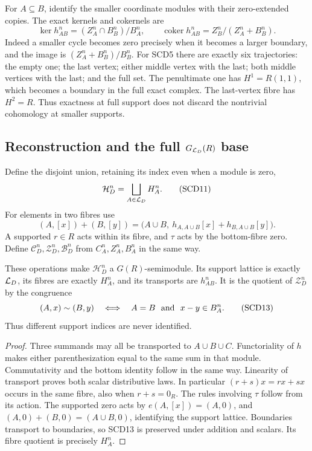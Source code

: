 For \(A\subseteq B\), identify the smaller coordinate modules with
their zero-extended copies. The exact kernels and cokernels are
\[
 \ker h_{AB}^n=(Z_A^n\cap B_B^n)/B_A^n,\qquad
 \operatorname{coker}h_{AB}^n=Z_B^n/(Z_A^n+B_B^n).
 \tag{SCD10}
\]
Indeed a smaller cycle becomes zero precisely when it becomes a
larger boundary, and the image is
\((Z_A^n+B_B^n)/B_B^n\).
For SCD5 there are exactly six trajectories: the empty one; the
last vertex; either middle vertex with the last; both middle vertices
with the last; and the full set. The penultimate one has
\(H^1=R(1,1)\), which becomes a boundary in the full exact complex.
The last-vertex fibre has \(H^2=R\). Thus exactness at full support
does not discard the nontrivial cohomology at smaller supports.

\subsection{Reconstruction and the full \(G_{\mathcal L_D}(R)\) base}

Define the disjoint union, retaining its index even when a module is zero,
\[
 \mathcal H_D^n=\bigsqcup_{A\in\mathcal L_D}H_A^n.
 \tag{SCD11}
\]
For elements in two fibres use
\[
 (A,[x])+(B,[y])
 =\bigl(A\cup B,\ h_{A,A\cup B}[x]+h_{B,A\cup B}[y]\bigr).
 \tag{SCD12}
\]
A supported \(r\in R\) acts within its fibre, and \(\tau\) acts by
the bottom-fibre zero. Define \(\mathcal C_D^n,\mathcal Z_D^n,
\mathcal B_D^n\) from \(C_A^n,Z_A^n,B_A^n\) in the same way.

\begin{theorem}
These operations make \(\mathcal H_D^n\) a \(G(R)\)-semimodule.
Its support lattice is exactly \(\mathcal L_D\), its fibres are exactly
\(H_A^n\), and its transports are \(h_{AB}^n\). It is the quotient
of \(\mathcal Z_D^n\) by the congruence
\[
 (A,x)\sim(B,y)
 \quad\Longleftrightarrow\quad A=B\ \hbox{ and }\ x-y\in B_A^n.
 \tag{SCD13}
\]
Thus different support indices are never identified.
\end{theorem}
\begin{proof}
Three summands may all be transported to \(A\cup B\cup C\).
Functoriality of \(h\) makes either parenthesization equal to
the same sum in that module. Commutativity and the bottom identity
follow in the same way. Linearity of transport proves both scalar
distributive laws. In particular \((r+s)x=rx+sx\) occurs in the
same fibre, also when \(r+s=0_R\). The rules involving \(\tau\)
follow from its action. The supported zero acts by
\(e(A,[x])=(A,0)\), and
\((A,0)+(B,0)=(A\cup B,0)\), identifying the support lattice.
Boundaries transport to boundaries, so SCD13 is preserved under
addition and scalars. Its fibre quotient is precisely \(H_A^n\).
\end{proof}

